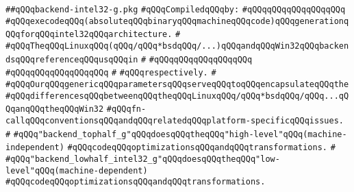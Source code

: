 \label{src/lib/compiler/back/low/main/intel32/backend-intel32-g.pkg}
\verb|##qQQqbackend-intel32-g.pkg|\newline
\newline
\verb|#qQQqCompiledqQQqby:|\newline
\verb|#qQQqqQQqqQQqqQQqqQQq|\newline
\newline
\newline
\verb|#qQQqexecodeqQQq(absoluteqQQqbinaryqQQqmachineqQQqcode)qQQqgenerationqQQqforqQQqintel32qQQqarchitecture.|\newline
\verb|#|\newline
\verb|#qQQqTheqQQqLinuxqQQq(qQQq/qQQq*bsdqQQq/...)qQQqandqQQqWin32qQQqbackendsqQQqreferenceqQQqusqQQqin|\newline
\verb|#|\newline
\verb|#qQQqqQQqqQQqqQQqqQQq|\newline
\verb|#qQQqqQQqqQQqqQQqqQQq|\newline
\verb|#|\newline
\verb|#qQQqrespectively.|\newline
\verb|#|\newline
\verb|#qQQqOurqQQqgenericqQQqparametersqQQqserveqQQqtoqQQqencapsulateqQQqthe|\newline
\verb|#qQQqdifferencesqQQqbetweenqQQqtheqQQqLinuxqQQq/qQQq*bsdqQQq/qQQq...qQQqanqQQqtheqQQqWin32|\newline
\verb|#qQQqfn-callqQQqconventionsqQQqandqQQqrelatedqQQqplatform-specificqQQqissues.|\newline
\verb|#|\newline
\verb|#qQQq"backend_tophalf_g"qQQqdoesqQQqtheqQQq"high-level"qQQq(machine-independent)|\newline
\verb|#qQQqcodeqQQqoptimizationsqQQqandqQQqtransformations.|\newline
\verb|#|\newline
\verb|#qQQq"backend_lowhalf_intel32_g"qQQqdoesqQQqtheqQQq"low-level"qQQq(machine-dependent)|\newline
\verb|#qQQqcodeqQQqoptimizationsqQQqandqQQqtransformations.|\newline
